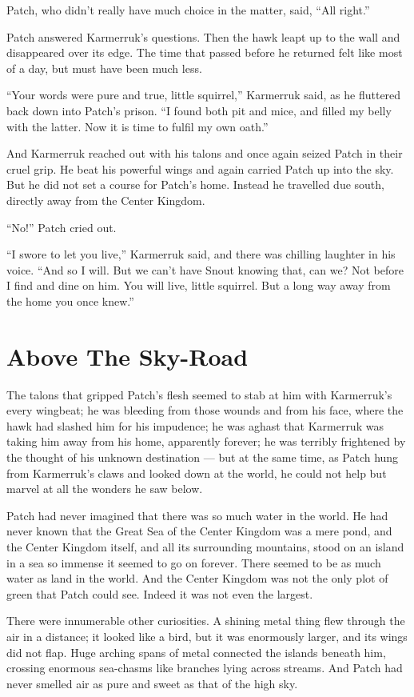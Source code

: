 \documentclass[ebook,oneside,openany,12pt]{memoir}
\begin{document}
Patch, who didn’t really have much choice in the matter, said, “All
right.”

Patch answered Karmerruk’s questions. Then the hawk leapt up to the
wall and disappeared over its edge. The time that passed before he
returned felt like most of a day, but must have been much less.

“Your words were pure and true, little squirrel,” Karmerruk said, as
he fluttered back down into Patch’s prison. “I found both pit and
mice, and filled my belly with the latter. Now it is time to fulfil my
own oath.”

And Karmerruk reached out with his talons and once again seized Patch
in their cruel grip. He beat his powerful wings and again carried
Patch up into the sky. But he did not set a course for Patch’s
home. Instead he travelled due south, directly away from the Center
Kingdom.

“No!” Patch cried out.

“I swore to let you live,” Karmerruk said, and there was chilling
laughter in his voice. “And so I will. But we can’t have Snout knowing
that, can we? Not before I find and dine on him. You will live, little
squirrel. But a long way away from the home you once knew.”


\section{Above The Sky-Road}

The talons that gripped Patch’s flesh seemed to stab at him with
Karmerruk’s every wingbeat; he was bleeding from those wounds and from
his face, where the hawk had slashed him for his impudence; he was
aghast that Karmerruk was taking him away from his home, apparently
forever; he was terribly frightened by the thought of his unknown
destination — but at the same time, as Patch hung from Karmerruk’s
claws and looked down at the world, he could not help but marvel at
all the wonders he saw below.

Patch had never imagined that there was so much water in the world. He
had never known that the Great Sea of the Center Kingdom was a mere
pond, and the Center Kingdom itself, and all its surrounding
mountains, stood on an island in a sea so immense it seemed to go on
forever. There seemed to be as much water as land in the world. And
the Center Kingdom was not the only plot of green that Patch could
see. Indeed it was not even the largest.

There were innumerable other curiosities. A shining metal thing flew
through the air in a distance; it looked like a bird, but it was
enormously larger, and its wings did not flap. Huge arching spans of
metal connected the islands beneath him, crossing enormous sea-chasms
like branches lying across streams. And Patch had never smelled air as
pure and sweet as that of the high sky.
\end{document}

